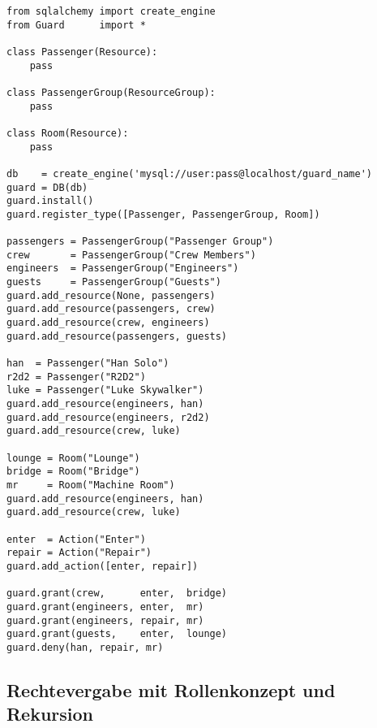\begin{lstlisting}
from sqlalchemy import create_engine
from Guard      import *

class Passenger(Resource):
    pass

class PassengerGroup(ResourceGroup):
    pass

class Room(Resource):
    pass

db    = create_engine('mysql://user:pass@localhost/guard_name')
guard = DB(db)
guard.install()
guard.register_type([Passenger, PassengerGroup, Room])

passengers = PassengerGroup("Passenger Group")
crew       = PassengerGroup("Crew Members")
engineers  = PassengerGroup("Engineers")
guests     = PassengerGroup("Guests")
guard.add_resource(None, passengers)
guard.add_resource(passengers, crew)
guard.add_resource(crew, engineers)
guard.add_resource(passengers, guests)

han  = Passenger("Han Solo")
r2d2 = Passenger("R2D2")
luke = Passenger("Luke Skywalker")
guard.add_resource(engineers, han)
guard.add_resource(engineers, r2d2)
guard.add_resource(crew, luke)

lounge = Room("Lounge")
bridge = Room("Bridge")
mr     = Room("Machine Room")
guard.add_resource(engineers, han)
guard.add_resource(crew, luke)

enter  = Action("Enter")
repair = Action("Repair")
guard.add_action([enter, repair])

guard.grant(crew,      enter,  bridge)
guard.grant(engineers, enter,  mr)
guard.grant(engineers, repair, mr)
guard.grant(guests,    enter,  lounge)
guard.deny(han, repair, mr)
\end{lstlisting}


\subsection{Rechtevergabe mit Rollenkonzept und Rekursion}

